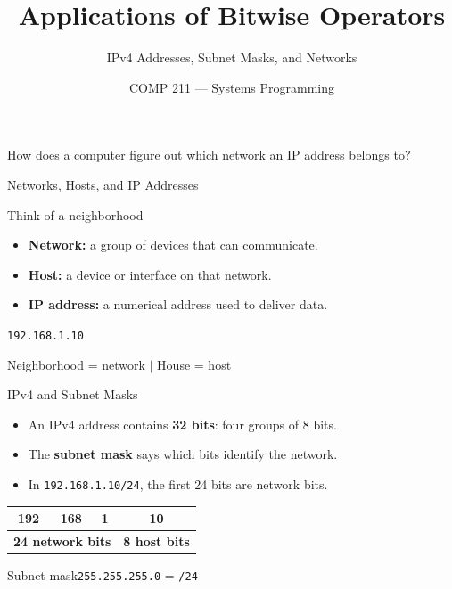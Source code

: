 \documentclass[aspectratio=169,11pt]{beamer}
\title{Applications of Bitwise Operators}
\subtitle{IPv4 Addresses, Subnet Masks, and Networks}
\author{COMP 211 --- Systems Programming}
\date{}
\begin{document}
\begin{frame}
\titlepage
\begin{center}\large How does a computer figure out which network an IP address belongs to?\end{center}
\end{frame}

\begin{frame}{Networks, Hosts, and IP Addresses}
\begin{block}{Think of a neighborhood}
\begin{itemize}
\item \textbf{Network:} a group of devices that can communicate.
\item \textbf{Host:} a device or interface on that network.
\item \textbf{IP address:} a numerical address used to deliver data.
\end{itemize}
\end{block}
\vspace{0.4cm}
\begin{center}
\Large \texttt{192.168.1.10}\par\medskip
\normalsize Neighborhood = network \quad $\vert$ \quad House = host
\end{center}
\end{frame}

\begin{frame}{IPv4 and Subnet Masks}
\begin{itemize}
\item An IPv4 address contains \textbf{32 bits}: four groups of 8 bits.
\item The \textbf{subnet mask} says which bits identify the network.
\item In \texttt{192.168.1.10/24}, the first 24 bits are network bits.
\end{itemize}
\vspace{0.3cm}
\begin{center}
\begin{tabular}{|c|c|c|c|}\hline
\cellcolor{pale}192 & \cellcolor{pale}168 & \cellcolor{pale}1 & 10\\\hline
\multicolumn{3}{|c|}{\textbf{24 network bits}} & \textbf{8 host bits}\\\hline
\end{tabular}
\end{center}
\vspace{0.35cm}
\begin{block}{Subnet mask}\centering\texttt{255.255.255.0} \quad = \quad \texttt{/24}\end{block}
\end{frame}
\end{document}
